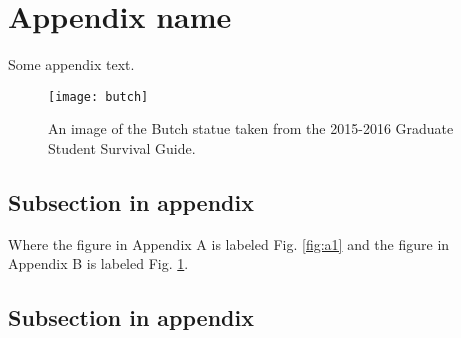 \section{Appendix name}

Some appendix text.
\begin{figure}[H] %
    \centering
    \texttt{[image: butch]}
    \caption{An image of the Butch statue taken from the 2015-2016 Graduate Student Survival Guide.}
    \label{fig:b1}
\end{figure}

\subsection{Subsection in appendix}
Where the figure in Appendix A is labeled Fig. \ref{fig:a1} and the figure in Appendix B is labeled Fig. \ref{fig:b1}.
\subsection{Subsection in appendix} 